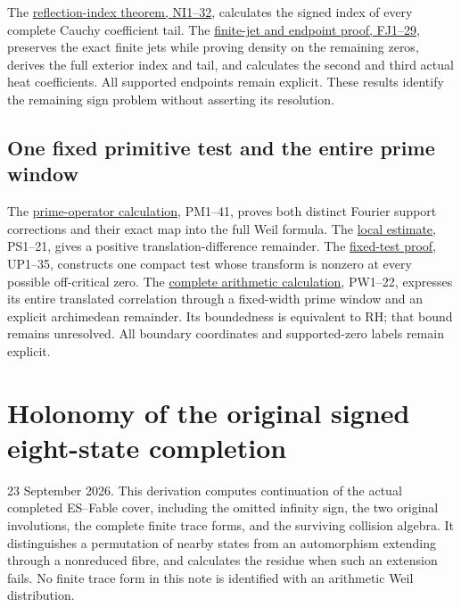 \documentclass[
  10pt,
  a4paper,
]{article}
\begin{document}
The \href{CAUCHY_REFLECTION_INDEX_DERIVATION.md}{reflection-index
theorem, NI1--32}, calculates the signed index of every complete Cauchy
coefficient tail. The
\href{FINITE_JET_COMPLEMENT_AND_HEAT_TRUNCATION.md}{finite-jet and
endpoint proof, FJ1--29}, preserves the exact finite jets while proving
density on the remaining zeros, derives the full exterior index and
tail, and calculates the second and third actual heat coefficients. All
supported endpoints remain explicit. These results identify the
remaining sign problem without asserting its resolution.

\subsection{One fixed primitive test and the entire prime
window}\label{one-fixed-primitive-test-and-the-entire-prime-window}

The \href{PRIME_PROJECTOR_MOBIUS_DERIVATION.md}{prime-operator
calculation}, PM1--41, proves both distinct Fourier support corrections
and their exact map into the full Weil formula. The
\href{PRIMITIVE_SHORT_SUPPORT_DERIVATION.md}{local estimate}, PS1--21,
gives a positive translation-difference remainder. The
\href{UNIVERSAL_PRIMITIVE_TRANSLATION_CRITERION.md}{fixed-test proof},
UP1--35, constructs one compact test whose transform is nonzero at every
possible off-critical zero. The
\href{PRIMITIVE_PRIME_WINDOW_DERIVATION.md}{complete arithmetic
calculation}, PW1--22, expresses its entire translated correlation
through a fixed-width prime window and an explicit archimedean
remainder. Its boundedness is equivalent to RH; that bound remains
unresolved. All boundary coordinates and supported-zero labels remain
explicit.

\clearpage

\section{Holonomy of the original signed eight-state
completion}\label{holonomy-of-the-original-signed-eight-state-completion}

23 September 2026. This derivation computes continuation of the actual
completed ES--Fable cover, including the omitted infinity sign, the two
original involutions, the complete finite trace forms, and the surviving
collision algebra. It distinguishes a permutation of nearby states from
an automorphism extending through a nonreduced fibre, and calculates the
residue when such an extension fails. No finite trace form in this note
is identified with an arithmetic Weil distribution.
\end{document}
